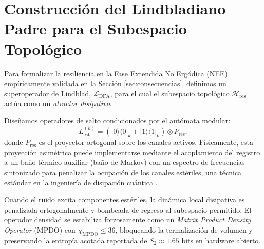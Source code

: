 \documentclass[12pt,a4paper]{article}
\theoremstyle{plain}
\theoremstyle{definition}
\theoremstyle{remark}
\begin{document}
\section{Construcción del Lindbladiano Padre para el Subespacio Topológico}
\label{app:lindblad_construction}

Para formalizar la resiliencia en la Fase Extendida No Ergódica (NEE) empíricamente validada en la Sección \ref{sec:consecuencias}, definimos un superoperador de Lindblad, $\mathcal{L}_{\text{DFA}}$, para el cual el subespacio topológico $\mathcal{H}_{\text{res}}$ actúa como un \textit{atractor disipativo}.

Diseñamos operadores de salto condicionados por el autómata modular:
\begin{equation}
L_{\text{est}}^{(k)} = \left( |0\rangle\langle 0|_k + |1\rangle\langle 1|_k \right) \otimes P_{\text{res}},
\end{equation}
donde $P_{\text{res}}$ es el proyector ortogonal sobre los canales activos. Físicamente, esta proyección asimétrica puede implementarse mediante el acoplamiento del registro a un baño térmico auxiliar (baño de Markov) con un espectro de frecuencias sintonizado para penalizar la ocupación de los canales estériles, una técnica estándar en la ingeniería de disipación cuántica \cite{Liu2025}. 

Cuando el ruido excita componentes estériles, la dinámica local disipativa es penalizada ortogonalmente y bombeada de regreso al subespacio permitido. El operador densidad se estabiliza forzosamente como un \textit{Matrix Product Density Operator} (MPDO) con $\chi_{\text{MPDO}} \le 36$, bloqueando la termalización de volumen y preservando la entropía acotada reportada de $S_2 \approx 1.65$ bits en hardware abierto.
\end{document}
